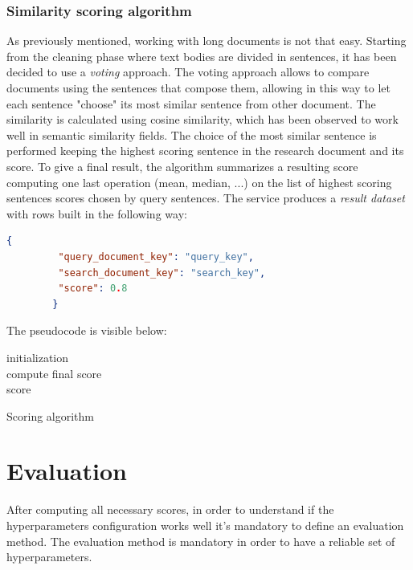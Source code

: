 \documentclass[\main/main.tex]{subfiles}
\begin{document}
\subsubsection{Similarity scoring algorithm}
As previously mentioned, working with long documents is not that easy. Starting from the cleaning phase where text bodies are divided in sentences, it has been decided to use a \textit{voting} approach. The voting approach allows to compare documents using the sentences that compose them, allowing in this way to let each sentence "choose" its most similar sentence from other document. The similarity is calculated using cosine similarity, which has been observed to work well in semantic similarity fields. The choice of the most similar sentence is performed keeping the highest scoring sentence in the research document and its score. To give a final result, the algorithm summarizes a resulting score computing one last operation (mean, median, ...) on the list of highest scoring sentences scores chosen by query sentences. The service produces a \textit{result dataset} with rows built in the following way:
\\
\begin{center}
    \begin{lstlisting}[language=json, caption="Parameter message example", captionpos=b]
        {
         "query_document_key": "query_key",
         "search_document_key": "search_key",
         "score": 0.8
        }
    \end{lstlisting}
\end{center}
The pseudocode is visible below:
\begin{center}
    \begin{algorithm}[H]
     initialization\\
     compute final score\\
     \Return score
     \caption{Scoring algorithm}
    \end{algorithm}
\end{center}

\section{Evaluation}
After computing all necessary scores, in order to understand if the hyperparameters configuration works well it's mandatory to define an evaluation method. The evaluation method is mandatory in order to have a reliable set of hyperparameters. \\
\end{document}
